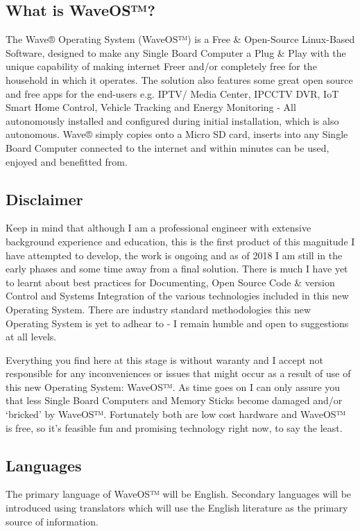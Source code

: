 \documentclass[letterpaper,10pt,openany,oneside,english]{sphinxmanual}
\begin{document}
\subsection{What is WaveOS™?}
\label{\detokenize{end-user:what-is-waveos}}
The Wave® Operating System (WaveOS™) is a Free \& Open-Source Linux-Based Software, designed to make any Single Board Computer a Plug \& Play  with the unique capability of making internet Freer and/or completely free for the household in which it operates. The solution also features some great open source and free apps for the end-users e.g. IPTV/ Media Center, IPCCTV DVR, IoT Smart Home Control, Vehicle Tracking and Energy Monitoring - All autonomously installed and configured during initial installation, which is also autonomous. Wave® simply copies onto a Micro SD card, inserts into any Single Board Computer connected to the internet and within minutes can be used, enjoyed and benefitted from.


\subsection{Disclaimer}
\label{\detokenize{end-user:disclaimer}}
Keep in mind that although I am a professional engineer with extensive background experience and education, this is the first product of this magnitude I have attempted to develop, the work is ongoing and as of 2018 I am still in the early phases and some time away from a final solution. There is much I have yet to learnt about best practices for Documenting, Open Source Code \& version Control and Systems Integration of the various technologies included in this new Operating System. There are industry standard methodologies this new Operating System is yet to adhear to - I remain humble and open to suggestions at all levels.

Everything you find here at this stage is without waranty and I accept not responsible for any inconveniences or issues that might occur as a result of use of this new Operating System: WaveOS™. As time goes on I can only assure you that less Single Board Computers and Memory Sticks become damaged and/or ‘bricked’ by WaveOS™. Fortunately both are low cost hardware and WaveOS™ is free, so it’s feasible fun and promising technology right now, to say the least.


\subsection{Languages}
\label{\detokenize{end-user:languages}}
The primary language of WaveOS™ will be English. Secondary languages will be introduced using translators which will use the English literature as the primary source of information.
\end{document}
